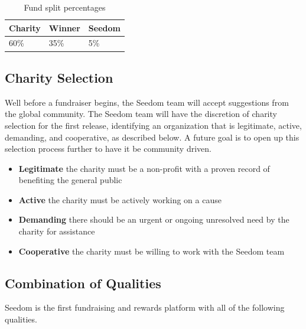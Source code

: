 \documentclass[11pt]{article}
\begin{document}
\begin{table}[H]
\begin{center}
\begin{tabular}{| l | l | l |}
\hline
\textbf{Charity} & \textbf{Winner} & \textbf{Seedom} \\ \hline
60\% & 35\%  & 5\% \\ \hline
\end{tabular}
\caption{Fund split percentages}
\label{tab:fundSplitPercentages}
\end{center}
\end{table}

\subsection{Charity Selection}

Well before a fundraiser begins, the Seedom team will accept suggestions from the global community. The Seedom team will have the discretion of charity selection for the first release, identifying an organization that is legitimate, active, demanding, and cooperative, as described below. A future goal is to open up this selection process further to have it be community driven.

\begin{itemize}
\item{\textbf{Legitimate} the charity must be a non-profit with a proven record of benefiting the general public}
\item{\textbf{Active} the charity must be actively working on a cause}
\item{\textbf{Demanding} there should be an urgent or ongoing unresolved need by the charity for assistance}
\item{\textbf{Cooperative} the charity must be willing to work with the Seedom team}
\end{itemize}

\subsection{Combination of Qualities}

Seedom is the first fundraising and rewards platform with all of the following qualities.
\end{document}
